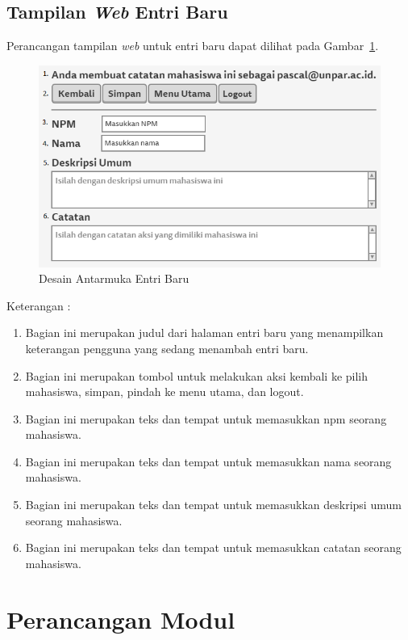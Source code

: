 \subsection{Tampilan {\it Web} Entri Baru}
Perancangan tampilan {\it web} untuk entri baru dapat dilihat pada Gambar~\ref{fig:entribaru}.
\begin{figure}[ht]
\centering
\includegraphics[scale=0.9]{Gambar/entribaru.png}
\caption[Desain Antarmuka Entri Baru]{Desain Antarmuka Entri Baru}
\label{fig:entribaru}
\end{figure}

Keterangan :
\begin{enumerate}[(1)]
\item
Bagian ini merupakan judul dari halaman entri baru yang menampilkan keterangan pengguna yang sedang menambah entri baru.
\item
Bagian ini merupakan tombol untuk melakukan aksi kembali ke pilih mahasiswa, simpan, pindah ke menu utama, dan logout.
\item
Bagian ini merupakan teks dan tempat untuk memasukkan npm seorang mahasiswa.
\item
Bagian ini merupakan teks dan tempat untuk memasukkan nama seorang mahasiswa.
\item
Bagian ini merupakan teks dan tempat untuk memasukkan deskripsi umum seorang mahasiswa.
\item
Bagian ini merupakan teks dan tempat untuk memasukkan catatan seorang mahasiswa.
\end{enumerate}

\section{Perancangan Modul}
\label{sec:perancanganmodul}

